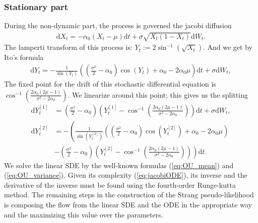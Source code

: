 \subsubsection{Stationary part}
During the non-dynamic part, the process is governed the jacobi diffusion
\begin{align}
    \mathrm{d}X_t = -\alpha_0\left(X_t - \mu\right)\mathrm{d}t + \sigma \sqrt{X_t\left(1 - X_t\right)}\mathrm{d}W_t.
\end{align}
The lamperti transform of this process is: $Y_t := 2 \sin^{-1}\left(\sqrt{X_t}\right)$. And we get by Ito's formula 
\begin{align}
    \mathrm{d}Y_t = -\frac{1}{\sin\left(Y_t\right)}\left(\left(\frac{\sigma^2}{2}-\alpha_0\right)\cos(Y_t) + \alpha_0 - 2\alpha_0\mu\right)\mathrm{d}t + \sigma \mathrm{d}W_t, \label{eq:JacobiLampertiSDE}
\end{align}
The fixed point for the drift of this stochastic differential equation is $\cos^{-1}\left(\frac{2\alpha_0\left(2\mu - 1\right)}{\sigma^2 - 2\alpha_0}\right)$. We linearize around this point; this gives us the splitting
\begin{align}
    \mathrm{d}Y_t^{[1]} &= \left(\frac{\sigma^2}{2} - \alpha_0\right)\left(Y_t^{[1]} - \cos^{-1}\left(\frac{2\alpha_0\left(2\mu - 1\right)}{\sigma^2 - 2\alpha_0}\right)\right)\mathrm{d}t + \sigma \mathrm{d}W_t,\\
    \mathrm{d}Y_t^{[2]} &= -\left(\frac{1}{\sin\left(Y_t^{[2]}\right)}\left(\left(\frac{\sigma^2}{2}-\alpha_0\right)\cos(Y_t^{[2]}) + \alpha_0 - 2\alpha_0\mu\right) \right. \nonumber \\
    &- \left. \left(\frac{\sigma^2}{2} - \alpha_0\right)\left(Y_t^{[2]} - \cos^{-1}\left(\frac{2\alpha_0\left(2\mu - 1\right)}{\sigma^2 - 2\alpha_0}\right)\right) \right)\mathrm{d}t. \label{eq:jacobiODE}
\end{align}
We solve the linear SDE by the well-known formulas (\ref{eq:OU_mean}) and (\ref{eq:OU_variance}). Given its complexity (\ref{eq:jacobiODE}), its inverse and the derivative of the inverse must be found using the fourth-order Runge-kutta method. The remaining steps in the construction of the Strang pseudo-likelihood is composing the flow from the linear SDE and the ODE in the appropriate way and the maximizing this value over the parameters.
